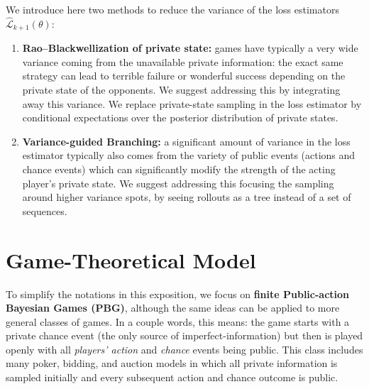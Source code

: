\documentclass[12pt, a4paper]{article}
\begin{document}
We introduce here two methods to reduce the variance of the loss estimators $\widehat{\mathcal{L}}_{k+1}(\theta)$:
\begin{enumerate}[label =(\roman*)]
  \item \textbf{Rao--Blackwellization of private state:} games have typically a very wide variance coming from the unavailable private information: the exact same strategy can lead to terrible failure or wonderful success depending on the private state of the opponents.
  We suggest addressing this by integrating away this variance.
  We replace private-state sampling in the loss estimator by conditional expectations over the posterior distribution of private states.

  \item \textbf{Variance-guided Branching:} a significant amount of variance in the loss estimator typically also comes from the variety of public events (actions and chance events) which can significantly modify the strength of the acting player's private state.
  We suggest addressing this focusing the sampling around higher variance spots, by seeing rollouts as a tree instead of a set of sequences.
\end{enumerate}

\section{Game-Theoretical Model}\label{sec:pbg}

To simplify the notations in this exposition, we focus on \textbf{finite Public-action Bayesian Games (PBG)}, although the same ideas can be applied to more general classes of games.
In a couple words, this means: the game starts with a private chance event (the only source of imperfect-information) but then is played openly with all \textit{players' action} and \textit{chance} events being public.
This class includes many poker, bidding, and auction models in which all private information is sampled initially and every subsequent action and chance outcome is public.
\end{document}

